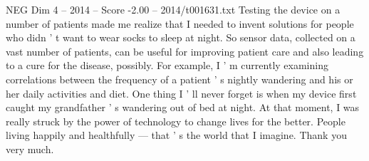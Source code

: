 \begin{textsample}{NEG Dim 4 – 2014 – Score -2.00 – 2014/t001631.txt}
Testing the device on a number of patients made me realize that I needed to invent solutions for people who didn ' t want to wear socks to sleep at night.
So sensor data, collected on a vast number of patients, can be useful for improving patient care and also leading to a cure for the disease, possibly.
For example, I ' m currently examining correlations between the frequency of a patient ' s nightly wandering and his or her daily activities and diet.
One thing I ' ll never forget is when my device first caught my grandfather ' s wandering out of bed at night.
At that moment, I was really struck by the power of technology to change lives for the better.
People living happily and healthfully — that ' s the world that I imagine.
Thank you very much.

\end{textsample}
